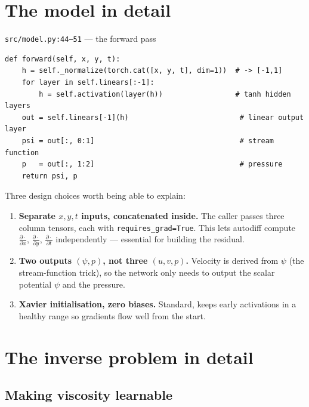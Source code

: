 \documentclass[11pt,a4paper]{article}
\newcommand{\pd}[2]{\frac{\partial #1}{\partial #2}}
\begin{document}
\section{The model in detail}
\label{sec:model-detail}

\begin{coderef}{\texttt{src/model.py:44--51} --- the forward pass}
\begin{lstlisting}[style=pycode]
def forward(self, x, y, t):
    h = self._normalize(torch.cat([x, y, t], dim=1))  # -> [-1,1]
    for layer in self.linears[:-1]:
        h = self.activation(layer(h))                 # tanh hidden layers
    out = self.linears[-1](h)                          # linear output layer
    psi = out[:, 0:1]                                  # stream function
    p   = out[:, 1:2]                                  # pressure
    return psi, p
\end{lstlisting}
\end{coderef}

Three design choices worth being able to explain:

\begin{enumerate}[leftmargin=2em]
  \item \textbf{Separate $x,y,t$ inputs, concatenated inside.} The caller passes
        three column tensors, each with \texttt{requires\_grad=True}. This lets
        autodiff compute $\pd{\cdot}{x}$, $\pd{\cdot}{y}$, $\pd{\cdot}{t}$
        independently --- essential for building the residual.
  \item \textbf{Two outputs $(\psi, p)$, not three $(u,v,p)$.} Velocity is
        derived from $\psi$ (the stream-function trick), so the network only
        needs to output the scalar potential $\psi$ and the pressure.
  \item \textbf{Xavier initialisation, zero biases.} Standard, keeps early
        activations in a healthy range so gradients flow well from the start.
\end{enumerate}

\section{The inverse problem in detail}
\label{sec:inverse-detail}

\subsection{Making viscosity learnable}
\label{sec:learnable-nu}
\end{document}

